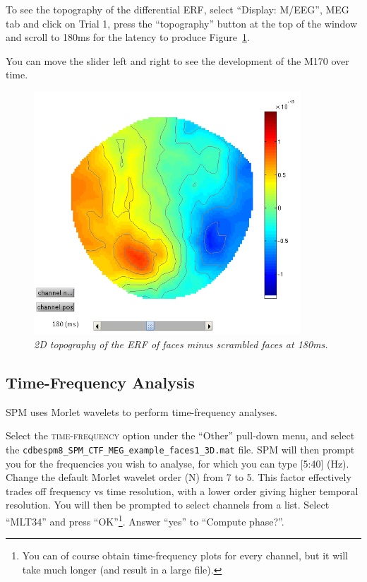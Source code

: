 To see the topography of the differential ERF, select ``Display: M/EEG'', MEG tab and click on Trial 1, press the ``topography'' button at the top of the window and scroll to 180ms for the latency to produce Figure~\ref{multimodal:fig:12}.

You can move the slider left and right to see the development of the M170 over time.

\begin{figure}
\begin{center}
\includegraphics[width=100mm]{multimodal/figures/meg_topo180}
\caption{\em 2D topography of the ERF of faces minus scrambled faces at 180ms. \label{multimodal:fig:12}}
\end{center}
\end{figure}

\subsection{Time-Frequency Analysis}

SPM uses Morlet wavelets to perform time-frequency analyses.

Select the \textsc{time-frequency} option under the ``Other'' pull-down menu, and select the \texttt{cdbespm8\_\-SPM\_\-CTF\_\-MEG\_\-example\_\-faces1\_\-3D.mat} file. SPM will then prompt you for the frequencies you wish to analyse, for which you can type [5:40] (Hz). Change the default Morlet wavelet order (N) from 7 to 5. This factor effectively trades off frequency vs time resolution, with a lower order giving higher temporal resolution. You will then be prompted to select channels from a list. Select ``MLT34'' and press ``OK''\footnote{You can of course obtain time-frequency plots for every channel, but it will take much longer (and result in a large file).}. Answer ``yes'' to ``Compute phase?''.

